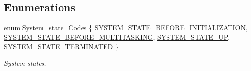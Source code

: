 \subsection*{Enumerations}
\begin{DoxyCompactItemize}
\item 
enum \mbox{\hyperlink{group__RTEMSScoreSysState_ga959824776c35a999ecd2720fde987d72}{System\+\_\+state\+\_\+\+Codes}} \{ \mbox{\hyperlink{group__RTEMSScoreSysState_gga959824776c35a999ecd2720fde987d72abcc8d66092564f2ca7197b4d98cee905}{S\+Y\+S\+T\+E\+M\+\_\+\+S\+T\+A\+T\+E\+\_\+\+B\+E\+F\+O\+R\+E\+\_\+\+I\+N\+I\+T\+I\+A\+L\+I\+Z\+A\+T\+I\+ON}}, 
\mbox{\hyperlink{group__RTEMSScoreSysState_gga959824776c35a999ecd2720fde987d72a5a9dd2d81d85c0de5b05a588217e62e7}{S\+Y\+S\+T\+E\+M\+\_\+\+S\+T\+A\+T\+E\+\_\+\+B\+E\+F\+O\+R\+E\+\_\+\+M\+U\+L\+T\+I\+T\+A\+S\+K\+I\+NG}}, 
\mbox{\hyperlink{group__RTEMSScoreSysState_gga959824776c35a999ecd2720fde987d72a4931ea058a4d35dbefc15ef5e8a59395}{S\+Y\+S\+T\+E\+M\+\_\+\+S\+T\+A\+T\+E\+\_\+\+UP}}, 
\mbox{\hyperlink{group__RTEMSScoreSysState_gga959824776c35a999ecd2720fde987d72a2c4ef3aa7a6c883fb850bd989a35afed}{S\+Y\+S\+T\+E\+M\+\_\+\+S\+T\+A\+T\+E\+\_\+\+T\+E\+R\+M\+I\+N\+A\+T\+ED}}
 \}
\begin{DoxyCompactList}\small\item\em System states. \end{DoxyCompactList}\end{DoxyCompactItemize}
